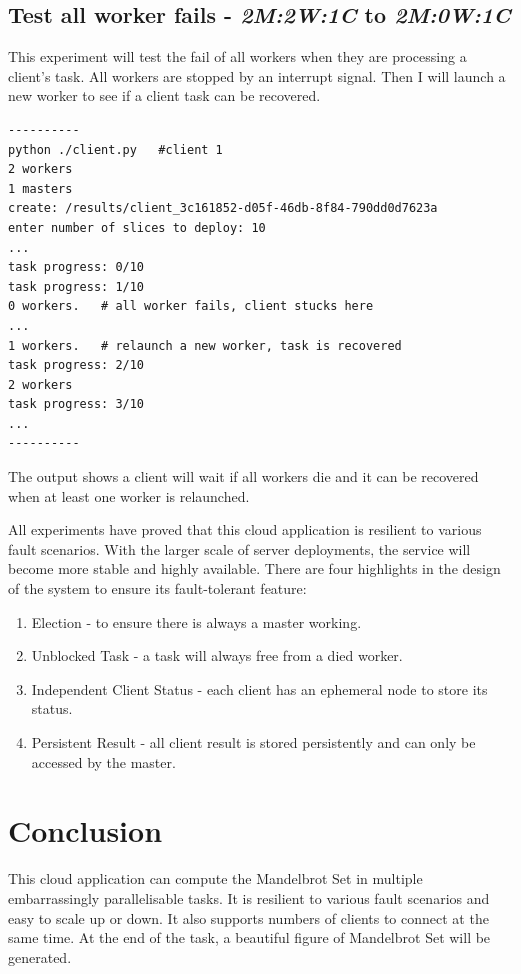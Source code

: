 \documentclass[runningheads,a4paper]{llncs}
\begin{document}
\subsection{Test all worker fails - \emph{2M:2W:1C} to \emph{2M:0W:1C}}
This experiment will test the fail of all workers when they are processing a client's task. All workers are stopped by an interrupt signal. Then I will launch a new worker to see if a client task can be recovered.

\begin{verbatim}
----------
python ./client.py   #client 1
2 workers
1 masters
create: /results/client_3c161852-d05f-46db-8f84-790dd0d7623a
enter number of slices to deploy: 10
...
task progress: 0/10
task progress: 1/10
0 workers.   # all worker fails, client stucks here
...
1 workers.   # relaunch a new worker, task is recovered
task progress: 2/10
2 workers
task progress: 3/10
...
----------
\end{verbatim}
The output shows a client will wait if all workers die and it can be recovered when at least one worker is relaunched.

All experiments have proved that this cloud application is resilient to various fault scenarios. With the larger scale of server deployments, the service will become more stable and highly available. There are four highlights in the design of the system to ensure its fault-tolerant feature:

\begin{enumerate}
\item Election -  to ensure there is always a master working.
\item Unblocked Task - a task will always free from a died worker.
\item Independent Client Status - each client has an ephemeral node to store its status.
\item Persistent Result -  all client result is stored persistently and can only be accessed by the master.
\end{enumerate}



\section{Conclusion}

This cloud application can compute the Mandelbrot Set in multiple embarrassingly parallelisable tasks. It is resilient to various fault scenarios and easy to scale up or down. It also supports numbers of clients to connect at the same time. At the end of the task, a beautiful figure of Mandelbrot Set will be generated. 
\end{document}
